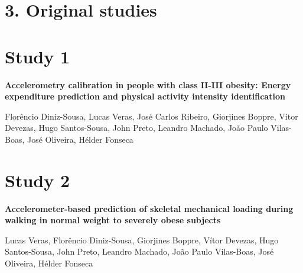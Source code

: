 \documentclass[12pt]{article}
\def\blankpage{%
      \clearpage%
      \thispagestyle{empty}%
      \addtocounter{page}{+0}%
      \null%
      \clearpage}
\begin{document}
\pagebreak
{}
\blankpage

\section*{\vfill\raggedleft\bfseries 3. Original studies}
\thispagestyle{empty} 
\blankpage

\section*{\vfill\raggedleft\bfseries Study 1}
\noindent \textbf{Accelerometry calibration in people with class II-III obesity: Energy expenditure prediction and physical activity intensity identification}

\bigskip

\noindent Florêncio Diniz-Sousa, Lucas Veras, José Carlos Ribeiro, Giorjines Boppre, Vítor Devezas, Hugo Santos-Sousa, John Preto, Leandro Machado, João Paulo Vilas-Boas, José Oliveira, Hélder Fonseca
\thispagestyle{empty}
\blankpage


\pagebreak

\section*{\vfill\raggedleft\bfseries Study 2}
\noindent \textbf{Accelerometer-based prediction of skeletal mechanical loading during walking in normal weight to severely obese subjects}

\bigskip

\noindent Lucas Veras, Florêncio Diniz-Sousa, Giorjines Boppre, Vítor Devezas, Hugo Santos-Sousa, John Preto, Leandro Machado, João Paulo Vilas-Boas, José Oliveira, Hélder Fonseca
\thispagestyle{empty}
\blankpage


\pagebreak
\end{document}

